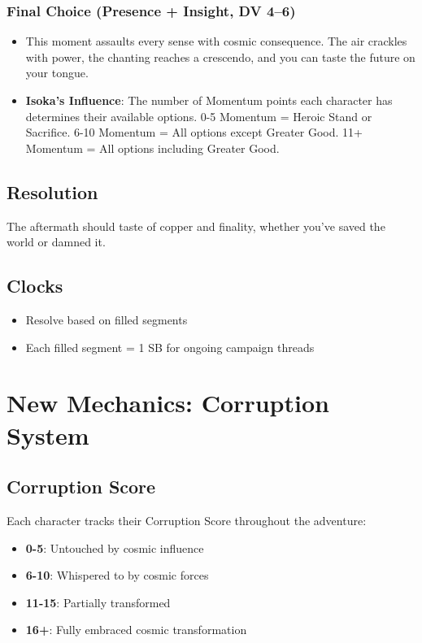 \documentclass[11pt]{article}
\begin{document}
\subsubsection{Final Choice (Presence + Insight, DV 4--6)}
\begin{itemize}[leftmargin=*]
    \item This moment assaults every sense with cosmic consequence. The air crackles with power, the chanting reaches a crescendo, and you can taste the future on your tongue.
    \item \textbf{Isoka's Influence}: The number of Momentum points each character has determines their available options. 0-5 Momentum = Heroic Stand or Sacrifice. 6-10 Momentum = All options except Greater Good. 11+ Momentum = All options including Greater Good.
\end{itemize}

\subsection{Resolution}

The aftermath should taste of copper and finality, whether you've saved the world or damned it.

\subsection{Clocks}
\begin{itemize}[leftmargin=*]
    \item Resolve based on filled segments
    \item Each filled segment = 1 SB for ongoing campaign threads
\end{itemize}

\newpage

\section{New Mechanics: Corruption System}

\subsection{Corruption Score}

Each character tracks their Corruption Score throughout the adventure:
\begin{itemize}[leftmargin=*]
    \item \textbf{0-5}: Untouched by cosmic influence
    \item \textbf{6-10}: Whispered to by cosmic forces
    \item \textbf{11-15}: Partially transformed
    \item \textbf{16+}: Fully embraced cosmic transformation
\end{itemize}
\end{document}
